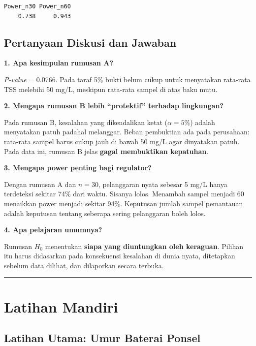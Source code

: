 \documentclass[
  indonesian,
  letterpaper,
]{book}
\begin{document}
\begin{verbatim}
Power_n30 Power_n60 
    0.738     0.943 
\end{verbatim}

\subsection{Pertanyaan Diskusi dan
Jawaban}\label{pertanyaan-diskusi-dan-jawaban-1}

\textbf{1. Apa kesimpulan rumusan A?}

\emph{P-value} = 0.0766. Pada taraf 5\% bukti belum cukup untuk
menyatakan rata-rata TSS melebihi 50 mg/L, meskipun rata-rata sampel di
atas baku mutu.

\textbf{2. Mengapa rumusan B lebih ``protektif'' terhadap lingkungan?}

Pada rumusan B, kesalahan yang dikendalikan ketat (\(\alpha = 5\%\))
adalah menyatakan patuh padahal melanggar. Beban pembuktian ada pada
perusahaan: rata-rata sampel harus cukup jauh di bawah 50 mg/L agar
dinyatakan patuh. Pada data ini, rumusan B jelas \textbf{gagal
membuktikan kepatuhan}.

\textbf{3. Mengapa power penting bagi regulator?}

Dengan rumusan A dan \(n = 30\), pelanggaran nyata sebesar 5 mg/L hanya
terdeteksi sekitar 74\% dari waktu. Sisanya lolos. Menambah sampel
menjadi 60 menaikkan power menjadi sekitar 94\%. Keputusan jumlah sampel
pemantauan adalah keputusan tentang seberapa sering pelanggaran boleh
lolos.

\textbf{4. Apa pelajaran umumnya?}

Rumusan \(H_0\) menentukan \textbf{siapa yang diuntungkan oleh
keraguan}. Pilihan itu harus didasarkan pada konsekuensi kesalahan di
dunia nyata, ditetapkan sebelum data dilihat, dan dilaporkan secara
terbuka.

\begin{center}\rule{0.5\linewidth}{0.5pt}\end{center}

\section{Latihan Mandiri}\label{latihan-mandiri-1}

\subsection{Latihan Utama: Umur Baterai
Ponsel}\label{latihan-utama-umur-baterai-ponsel}
\end{document}
